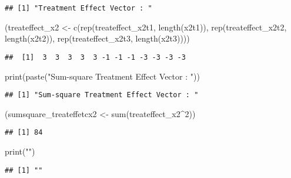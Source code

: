 \documentclass[
]{article}
\newenvironment{Shaded}{\begin{snugshade}}{\end{snugshade}}
\newcommand{\DecValTok}[1]{\textcolor[rgb]{0.00,0.00,0.81}{#1}}
\newcommand{\FunctionTok}[1]{\textcolor[rgb]{0.00,0.00,0.00}{#1}}
\newcommand{\NormalTok}[1]{#1}
\newcommand{\OtherTok}[1]{\textcolor[rgb]{0.56,0.35,0.01}{#1}}
\newcommand{\SpecialCharTok}[1]{\textcolor[rgb]{0.00,0.00,0.00}{#1}}
\newcommand{\StringTok}[1]{\textcolor[rgb]{0.31,0.60,0.02}{#1}}
\begin{document}
\begin{verbatim}
## [1] "Treatment Effect Vector : "
\end{verbatim}

\begin{Shaded}
\begin{Highlighting}[]
\NormalTok{(treateffect\_x2 }\OtherTok{\textless{}{-}} \FunctionTok{c}\NormalTok{(}\FunctionTok{rep}\NormalTok{(treateffect\_x2t1, }\FunctionTok{length}\NormalTok{(x2t1)), }
                     \FunctionTok{rep}\NormalTok{(treateffect\_x2t2, }\FunctionTok{length}\NormalTok{(x2t2)), }
                     \FunctionTok{rep}\NormalTok{(treateffect\_x2t3, }\FunctionTok{length}\NormalTok{(x2t3))))}
\end{Highlighting}
\end{Shaded}

\begin{verbatim}
##  [1]  3  3  3  3  3 -1 -1 -1 -3 -3 -3 -3
\end{verbatim}

\begin{Shaded}
\begin{Highlighting}[]
\FunctionTok{print}\NormalTok{(}\FunctionTok{paste}\NormalTok{(}\StringTok{"Sum{-}square Treatment Effect Vector : "}\NormalTok{))}
\end{Highlighting}
\end{Shaded}

\begin{verbatim}
## [1] "Sum-square Treatment Effect Vector : "
\end{verbatim}

\begin{Shaded}
\begin{Highlighting}[]
\NormalTok{(sumsquare\_treateffetcx2 }\OtherTok{\textless{}{-}} \FunctionTok{sum}\NormalTok{(treateffect\_x2}\SpecialCharTok{\^{}}\DecValTok{2}\NormalTok{)) }
\end{Highlighting}
\end{Shaded}

\begin{verbatim}
## [1] 84
\end{verbatim}

\begin{Shaded}
\begin{Highlighting}[]
\FunctionTok{print}\NormalTok{(}\StringTok{""}\NormalTok{)}
\end{Highlighting}
\end{Shaded}

\begin{verbatim}
## [1] ""
\end{verbatim}
\end{document}
